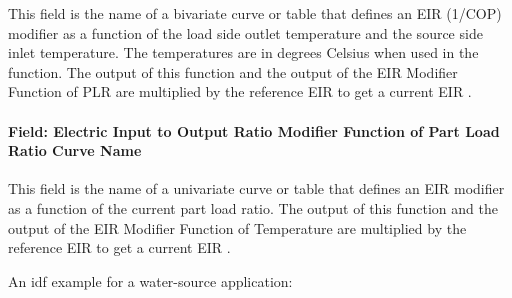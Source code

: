 This field is the name of a bivariate curve or table that defines an EIR (1/COP) modifier as a function of the load side outlet temperature and the source side inlet temperature.  The temperatures are in degrees Celsius when used in the function. The output of this function and the output of the EIR Modifier Function of PLR are multiplied by the reference EIR to get a current EIR .

\paragraph{Field: Electric Input to Output Ratio Modifier Function of Part Load Ratio Curve Name}\label{plhp_eir_inputs_eirfplr}

This field is the name of a univariate curve or table that defines an EIR modifier as a function of the current part load ratio.  The output of this function and the output of the EIR Modifier Function of Temperature are multiplied by the reference EIR to get a current EIR .

An idf example for a water-source application:

